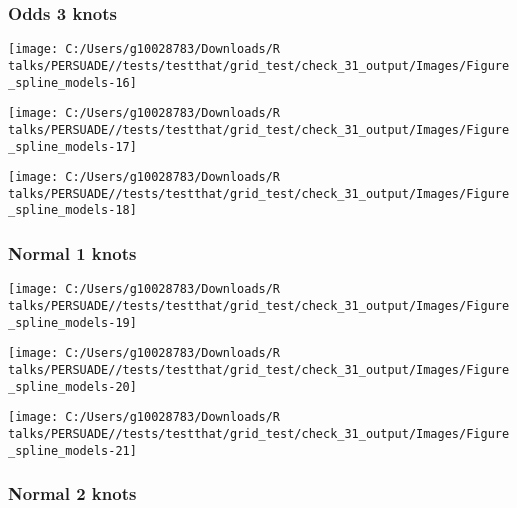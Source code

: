 \documentclass[
]{article}
\begin{document}
\clearpage

\subsubsection{Odds 3 knots}\label{odds-3-knots}

\begin{flushleft}\texttt{[image: C:/Users/g10028783/Downloads/R talks/PERSUADE//tests/testthat/grid\_test/check\_31\_output/Images/Figure\_spline\_models-16]} \end{flushleft}

\begin{flushleft}\texttt{[image: C:/Users/g10028783/Downloads/R talks/PERSUADE//tests/testthat/grid\_test/check\_31\_output/Images/Figure\_spline\_models-17]} \end{flushleft}

\begin{flushleft}\texttt{[image: C:/Users/g10028783/Downloads/R talks/PERSUADE//tests/testthat/grid\_test/check\_31\_output/Images/Figure\_spline\_models-18]} \end{flushleft}

\clearpage

\subsubsection{Normal 1 knots}\label{normal-1-knots}

\begin{flushleft}\texttt{[image: C:/Users/g10028783/Downloads/R talks/PERSUADE//tests/testthat/grid\_test/check\_31\_output/Images/Figure\_spline\_models-19]} \end{flushleft}

\begin{flushleft}\texttt{[image: C:/Users/g10028783/Downloads/R talks/PERSUADE//tests/testthat/grid\_test/check\_31\_output/Images/Figure\_spline\_models-20]} \end{flushleft}

\begin{flushleft}\texttt{[image: C:/Users/g10028783/Downloads/R talks/PERSUADE//tests/testthat/grid\_test/check\_31\_output/Images/Figure\_spline\_models-21]} \end{flushleft}

\clearpage

\subsubsection{Normal 2 knots}\label{normal-2-knots}
\end{document}
